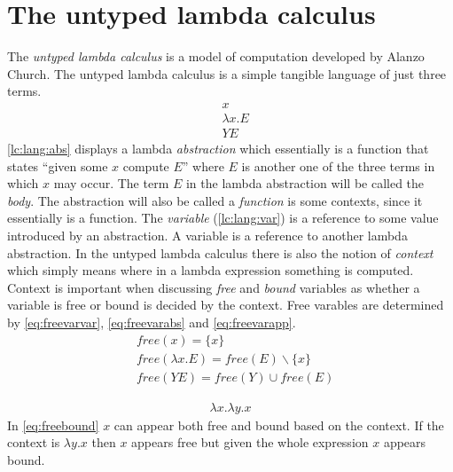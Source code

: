 \clearpage
\section{The untyped lambda calculus}\label{sec:lc}
The \textit{untyped lambda calculus} is a model of computation developed by Alanzo Church\cite{church1936unsolvable}.
The untyped lambda calculus is a simple tangible language of just three terms.
\begin{align}
  &x
  \label{lc:lang:var}\\
  &\lambda x . E
  \label{lc:lang:abs}\\
  &Y E
  \label{lc:lang:app}
\end{align}
\autoref{lc:lang:abs} displays a lambda \textit{abstraction} which essentially is a function that states ``given some $x$ compute $E$'' where $E$ is another one of the three terms in which $x$ may occur.
The term $E$ in the lambda abstraction will be called the \textit{body}.
The abstraction will also be called a \textit{function} is some contexts, since it essentially is a function.
The \textit{variable} (\autoref{lc:lang:var}) is a reference to some value introduced by an abstraction.
A variable is a reference to another lambda abstraction.
In the untyped lambda calculus there is also the notion of \textit{context} which simply means where in a lambda expression something is computed.
Context is important when discussing \textit{free} and \textit{bound} variables as whether a variable is free or bound is decided by the context.
Free varables are determined by \autoref{eq:freevarvar}, \autoref{eq:freevarabs} and \autoref{eq:freevarapp}.
\begin{align}
    \label{eq:freevarvar}
    &\textit{free}(x) = \{ x \}\\
    \label{eq:freevarabs}
    &\textit{free}(\lambda x . E) = \textit{free}(E) \backslash \{ x \}\\
    \label{eq:freevarapp}
    &\textit{free}(Y E) = \textit{free}(Y) \cup \textit{free}(E)
\end{align}
\begin{exmp}
    \begin{align}
        \lambda x . \lambda y . x\label{eq:freebound}
    \end{align}
    In \autoref{eq:freebound} $x$ can appear both free and bound based on the context.
    If the context is $\lambda y . x$ then $x$ appears free but given the whole expression $x$ appears bound.
\end{exmp}

